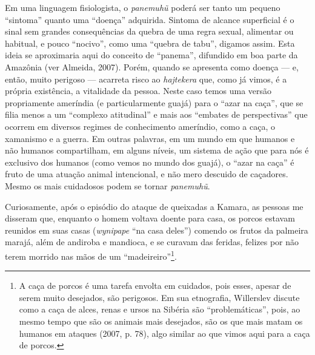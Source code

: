 Em uma linguagem fisiologista, o \emph{panemuhũ} poderá ser tanto um
pequeno ``sintoma'' quanto uma ``doença'' adquirida. Sintoma de alcance
superficial é o sinal sem grandes consequências da quebra de uma regra
sexual, alimentar ou habitual, e pouco ``nocivo'', como uma ``quebra de
tabu'', digamos assim. Esta ideia se aproximaria aqui do conceito de
``panema'', difundido em boa parte da Amazônia (ver Almeida, 2007).
Porém, quando se apresenta como doença --- e, então, muito perigoso ---
acarreta risco ao \emph{hajtekera} que, como já vimos, é a própria
existência, a vitalidade da pessoa. Neste caso temos uma versão
propriamente ameríndia (e particularmente guajá) para o ``azar na
caça'', que se filia menos a um ``complexo atitudinal'' e mais aos
``embates de perspectivas'' que ocorrem em diversos regimes de
conhecimento ameríndio, como a caça, o xamanismo e a guerra. Em outras
palavras, em um mundo em que humanos e não humanos compartilham, em
alguns níveis, um sistema de ação que para nós é exclusivo dos humanos
(como vemos no mundo dos guajá), o ``azar na caça'' é fruto de uma
atuação animal intencional, e não mero descuido de caçadores. Mesmo os
mais cuidadosos podem se tornar \emph{panemuhũ}.

Curiosamente, após o episódio do ataque de queixadas a Kamara, as
pessoas me disseram que, enquanto o homem voltava doente para casa, os
porcos estavam reunidos em suas casas (\emph{wynipape} ``na casa deles'')
comendo os frutos da palmeira marajá, além de andiroba e mandioca, e se
curavam das feridas, felizes por não terem morrido nas mãos de um
``madeireiro''\footnote{A caça de porcos é uma tarefa envolta em cuidados,
  pois esses, apesar de serem muito desejados, são perigosos. Em sua
  etnografia, Willerslev discute como a caça de alces, renas e ursos na
  Sibéria são ``problemáticas'', pois, ao mesmo tempo que são os animais
  mais desejados, são os que mais matam os humanos em ataques (2007,
  p. 78), algo similar ao que vimos aqui para a caça de porcos.}.
